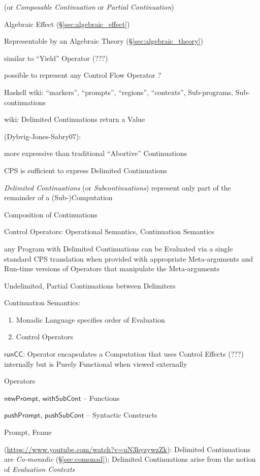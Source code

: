 (or \emph{Composable Continuation} or \emph{Partial Continuation})

Algebraic Effect (\S\ref{sec:algebraic_effect})

Representable by an Algebraic Theory (\S\ref{sec:algebraic_theory})

similar to ``Yield'' Operator (???) %

possible to represent any Control Flow Operator ? %

Haskell wiki: ``markers'', ``prompts'', ``regions'', ``contexts'',
Sub-programs, Sub-continuations

wiki: Delimited Continuations return a Value


(Dybvig-Jones-Sabry07):

more expressive than traditional ``Abortive'' Continuations

CPS is sufficient to express Delimited Continuations

\emph{Delimited Continuations} (or \emph{Subcontinuations}) represent
only part of the remainder of a (Sub-)Computation

Composition of Continuations

Control Operators: Operational Semantics, Continuation Semantics

any Program with Delimited Continuations can be Evaluated via a single
standard CPS translation when provided with appropriate Meta-arguments
and Run-time versions of Operators that manipulate the Meta-arguments

Undelimited, Partial Continuations between Delimiters

Continuation Semantics:
\begin{enumerate}
  \item Monadic Language specifies order of Evaluation
  \item Control Operators
\end{enumerate}

$\mathsf{runCC}$: Operator encapsulates a Computation that uses Control
Effects (???) internally but is Purely Functional when viewed
externally %

Operators

$\mathsf{newPrompt}$,
$\mathsf{withSubCont}$ -- Functions

$\mathsf{pushPrompt}$,
$\mathsf{pushSubCont}$ -- Syntactic Constructs

Prompt, Frame

\asterism

(\url{https://www.youtube.com/watch?v=uN3hyzywzZk}): Delimited Continuations are
\emph{Co-monadic} (\S\ref{sec:comonad}); Delimited Continuations arise from the
notion of \emph{Evaluation Contexts}

